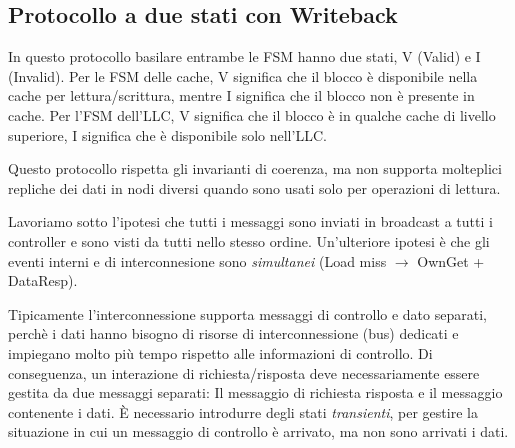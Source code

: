 \subsection{Protocollo a due stati con Writeback}
In questo protocollo basilare entrambe le FSM hanno due stati, V (Valid) e I (Invalid).
Per le FSM delle cache, V significa che il blocco è disponibile nella cache per lettura/scrittura, mentre I significa che il blocco non è presente in cache. Per l'FSM dell'LLC, V significa che il blocco è in qualche cache di livello superiore, I significa che è disponibile solo nell'LLC. 

\noindent Questo protocollo rispetta gli invarianti di coerenza, ma non supporta molteplici repliche dei dati in nodi diversi quando sono usati solo per operazioni di lettura. 

\begin{warn}
    Lavoriamo sotto l'ipotesi che tutti i messaggi sono inviati in broadcast a tutti i controller e sono visti da tutti nello stesso ordine. Un'ulteriore ipotesi è che gli eventi interni e di interconnesione sono \textit{simultanei} (Load miss $\rightarrow$ OwnGet + DataResp).
\end{warn}

\begin{figure}[ht]
    \centering
    \setlength{\fboxrule}{0.5pt} %
    \setlength{\fboxsep}{0pt}    %
\end{figure}

\noindent Tipicamente l'interconnessione supporta messaggi di controllo e dato separati, perchè i dati hanno bisogno di risorse di interconnessione (bus) dedicati e impiegano molto più tempo rispetto alle informazioni di controllo. 
Di conseguenza, un interazione di richiesta/risposta deve necessariamente essere gestita da due messaggi separati: Il messaggio di richiesta risposta e il messaggio contenente i dati. \uppercase{è} necessario introdurre degli stati \textit{transienti}, per gestire la situazione in cui un messaggio di controllo è arrivato, ma non sono arrivati i dati. 

